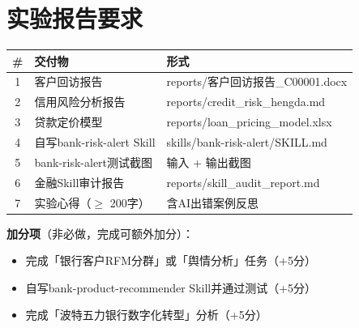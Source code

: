 \section*{实验报告要求}

\begin{table}[H]
\centering
\begin{tabular}{cll}
\toprule
\textbf{\#} & \textbf{交付物} & \textbf{形式} \\
\midrule
1 & 客户回访报告 & reports/客户回访报告\_C00001.docx \\
2 & 信用风险分析报告 & reports/credit\_risk\_hengda.md \\
3 & 贷款定价模型 & reports/loan\_pricing\_model.xlsx \\
4 & 自写bank-risk-alert Skill & skills/bank-risk-alert/SKILL.md \\
5 & bank-risk-alert测试截图 & 输入 + 输出截图 \\
6 & 金融Skill审计报告 & reports/skill\_audit\_report.md \\
7 & 实验心得（$\geq$ 200字） & 含AI出错案例反思 \\
\bottomrule
\end{tabular}
\end{table}

\textbf{加分项}（非必做，完成可额外加分）：

\begin{itemize}[leftmargin=2em]
  \item 完成「银行客户RFM分群」或「舆情分析」任务（+5分）
  \item 自写bank-product-recommender Skill并通过测试（+5分）
  \item 完成「波特五力银行数字化转型」分析（+5分）
\end{itemize}
